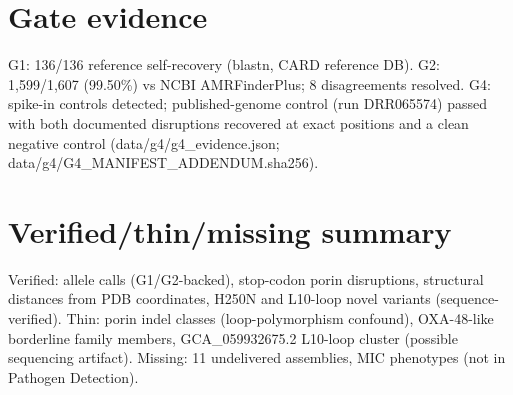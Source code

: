 \documentclass[11pt]{article}
\begin{document}
\appendix



\section{Gate evidence}
G1: 136/136 reference self-recovery (blastn, CARD reference DB). G2: 1,599/1,607 (99.50\%) vs NCBI AMRFinderPlus; 8 disagreements resolved. G4: spike-in controls detected; published-genome control (run DRR065574) passed with both documented disruptions recovered at exact positions and a clean negative control (data/g4/g4\_evidence.json; data/g4/G4\_MANIFEST\_ADDENDUM.sha256).
\section{Verified/thin/missing summary}
Verified: allele calls (G1/G2-backed), stop-codon porin disruptions, structural distances from PDB coordinates, H250N and L10-loop novel variants (sequence-verified). Thin: porin indel classes (loop-polymorphism confound), OXA-48-like borderline family members, GCA\_059932675.2 L10-loop cluster (possible sequencing artifact). Missing: 11 undelivered assemblies, MIC phenotypes (not in Pathogen Detection).
\end{document}
